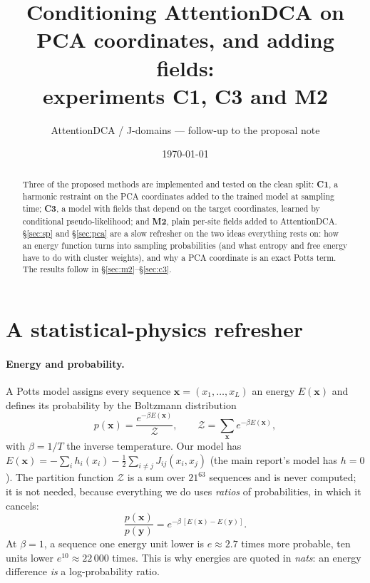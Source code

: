\documentclass[10pt,a4paper]{article}
\title{\vspace{-1.2cm}Conditioning AttentionDCA on PCA coordinates, and adding fields:\\
experiments C1, C3 and M2}
\author{AttentionDCA / J-domains --- follow-up to the proposal note}
\date{\today}
\begin{document}
\maketitle

\begin{abstract}
\noindent
Three of the proposed methods are implemented and tested on the clean split:
\textbf{C1}, a harmonic restraint on the PCA coordinates added to the trained model at sampling
time; \textbf{C3}, a model with fields that depend on the target coordinates, learned by
conditional pseudo-likelihood; and \textbf{M2}, plain per-site fields added to AttentionDCA.
\S\ref{sec:sp} and \S\ref{sec:pca} are a slow refresher on the two ideas everything rests on: how an
energy function turns into sampling probabilities (and what entropy and free energy have to do
with cluster weights), and why a PCA coordinate is an exact Potts term. The results follow in
\S\ref{sec:m2}--\S\ref{sec:c3}.
\end{abstract}

\section{A statistical-physics refresher}\label{sec:sp}
\paragraph{Energy and probability.} A Potts model assigns every sequence $\bm x=(x_1,\dots,x_L)$
an energy $E(\bm x)$ and defines its probability by the Boltzmann distribution
\begin{equation}
p(\bm x)=\frac{e^{-\beta E(\bm x)}}{\mathcal Z},\qquad \mathcal Z=\sum_{\bm x}e^{-\beta E(\bm x)} ,
\label{eq:boltz}
\end{equation}
with $\beta=1/T$ the inverse temperature. Our model has $E(\bm x)=-\sum_i h_i(x_i)-\frac12\sum_{i\neq j}
J_{ij}(x_i,x_j)$ (the main report's model has $h=0$). The partition function $\mathcal Z$ is a sum
over $21^{63}$ sequences and is never computed; it is not needed, because everything we do uses
\emph{ratios} of probabilities, in which it cancels:
\begin{equation}
\frac{p(\bm x)}{p(\bm y)}=e^{-\beta\,[E(\bm x)-E(\bm y)]} .
\end{equation}
At $\beta=1$, a sequence one energy unit lower is $e\approx2.7$ times more probable, ten units lower
$e^{10}\approx22\,000$ times. This is why energies are quoted in \emph{nats}: an energy
difference \emph{is} a log-probability ratio.
\end{document}
